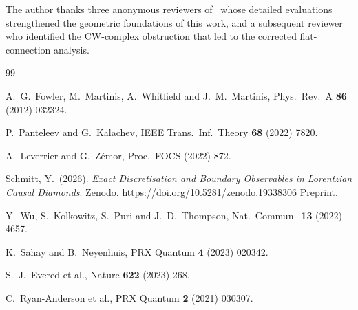 \documentclass[12pt,a4paper]{article}
\theoremstyle{plain}
\theoremstyle{definition}
\theoremstyle{remark}
\begin{document}
The author thanks three anonymous reviewers of~\cite{Schmitt2026a} whose
detailed evaluations strengthened the geometric foundations of this work,
and a subsequent reviewer who identified the CW-complex obstruction that
led to the corrected flat-connection analysis.

\begin{thebibliography}{99}

A.~G.~Fowler, M.~Martinis, A.~Whitfield and J.~M.~Martinis,
Phys.\ Rev.\ A \textbf{86} (2012) 032324.

P.~Panteleev and G.~Kalachev,
IEEE Trans.\ Inf.\ Theory \textbf{68} (2022) 7820.

A.~Leverrier and G.~Z\'emor,
Proc.\ FOCS (2022) 872.

Schmitt, Y.\ (2026).
\emph{Exact Discretisation and Boundary Observables in Lorentzian Causal
Diamonds}. Zenodo. https://doi.org/10.5281/zenodo.19338306
Preprint.

Y.~Wu, S.~Kolkowitz, S.~Puri and J.~D.~Thompson,
Nat.\ Commun.\ \textbf{13} (2022) 4657.

K.~Sahay and B.~Neyenhuis,
PRX Quantum \textbf{4} (2023) 020342.

S.~J.~Evered et al.,
Nature \textbf{622} (2023) 268.

C.~Ryan-Anderson et al.,
PRX Quantum \textbf{2} (2021) 030307.

\end{thebibliography}
\end{document}
